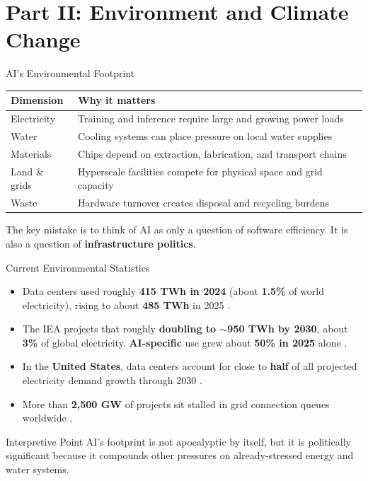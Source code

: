 \documentclass[aspectratio=169,11pt]{beamer}
\begin{document}
\section{Part II: Environment and Climate Change}

\begin{frame}{AI's Environmental Footprint}
\begin{table}[h]
\centering
\scriptsize
\begin{tabular}{@{}p{3.2cm}p{8.8cm}@{}}
\toprule
\textbf{Dimension} & \textbf{Why it matters} \\
\midrule
Electricity & Training and inference require large and growing power loads \\
\addlinespace
Water & Cooling systems can place pressure on local water supplies \\
\addlinespace
Materials & Chips depend on extraction, fabrication, and transport chains \\
\addlinespace
Land \& grids & Hyperscale facilities compete for physical space and grid capacity \\
\addlinespace
Waste & Hardware turnover creates disposal and recycling burdens \\
\bottomrule
\end{tabular}
\end{table}

\vspace{0.2cm}
The key mistake is to think of AI as only a question of software efficiency. It is also a question of \textbf{infrastructure politics}.
\end{frame}

\begin{frame}{Current Environmental Statistics}
\begin{itemize}
    \item Data centers used roughly \textbf{415 TWh in 2024} (about \textbf{1.5\%} of world electricity), rising to about \textbf{485 TWh} in 2025 \parencite{iea_energy_and_ai_2025, iea_electricity_2026}.
    \item The IEA projects that roughly \textbf{doubling to $\sim$950 TWh by 2030}, about \textbf{3\%} of global electricity. \textbf{AI-specific} use grew about \textbf{50\% in 2025} alone \parencite{iea_electricity_2026}.
    \item In the \textbf{United States}, data centers account for close to \textbf{half} of all projected electricity demand growth through 2030 \parencite{iea_electricity_2026}.
    \item More than \textbf{2,500 GW} of projects sit stalled in grid connection queues worldwide \parencite{iea_electricity_2026}.
\end{itemize}

\begin{alertblock}{Interpretive Point}
AI's footprint is not apocalyptic by itself, but it is politically significant because it compounds other pressures on already-stressed energy and water systems.
\end{alertblock}
\end{frame}
\end{document}
